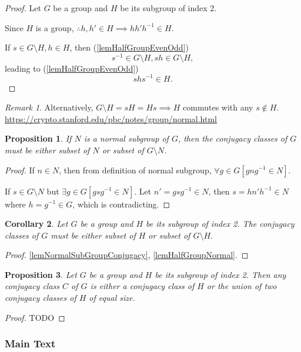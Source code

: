 \documentclass[12pt, letterpaper]{article}
\newcommand{\red}[1]{{\color{red} #1}}
\newtheorem{prop}{Proposition}[section]
\newtheorem{cor}[prop]{Corollary}
\theoremstyle{definition}
\theoremstyle{remark}
\newtheorem*{rem*}{Remark}
\theoremstyle{definition}
\theoremstyle{plain}
\numberwithin{equation}{section}
\begin{document}
	\begin{proof}
		Let $G$ be a group and $H$ be its subgroup of index 2.
		
		Since $H$ is a group, $\therefore h,h'\in H\implies hh'h^{-1}\in H$.
		
		If $s\in G\setminus H, h\in H$, then (\autoref{lemHalfGroupEvenOdd})
		\[ s^{-1}\in G\setminus H, sh\in G\setminus H ,\]
		leading to (\autoref{lemHalfGroupEvenOdd})
		\[ shs^{-1}\in H.\]
	\end{proof}
	\begin{rem*}
		Alternatively, $G\setminus H = sH=Hs\implies H$ commutes with any $s\notin H$.
		\url{https://crypto.stanford.edu/pbc/notes/group/normal.html}
	\end{rem*}
	\begin{prop}\label{lemNormalSubGroupConjugacy}
		If $N$ is a normal subgroup of $G$, then the conjugacy classes of $G$ must be either subset of $N$ or subset of $G\setminus N$.
	\end{prop}
	\begin{proof}
		If $n\in N$, then from definition of normal subgroup, $\forall g\in G[gng^{-1}\in N]$.
		
		If $s\in G\setminus N$ but $\exists g\in G[gsg^{-1}\in N]$.
		Let $n'=gsg^{-1}\in N$, then $s=hn'h^{-1}\in N$ where $h=g^{-1}\in G$, which is contradicting.
	\end{proof}
	\begin{cor}\label{lemHalfGroupConjugacy}
		Let $G$ be a group and $H$ be its subgroup of index 2.
		The conjugacy classes of $G$ must be either subset of $H$ or subset of $G\setminus H$.
	\end{cor}
	\begin{proof}
		\autoref{lemNormalSubGroupConjugacy},
		\autoref{lemHalfGroupNormal}.
	\end{proof}

	\begin{prop}
		Let $G$ be a group and $H$ be its subgroup of index 2.
		Then any conjugacy class $C$ of $G$ is either a conjugacy class of $H$
		or the union of two conjugacy classes of $H$ of equal size.
	\end{prop}
	\begin{proof}
		\red{TODO}
	\end{proof}
	\subsubsection{Main Text}
\end{document}
